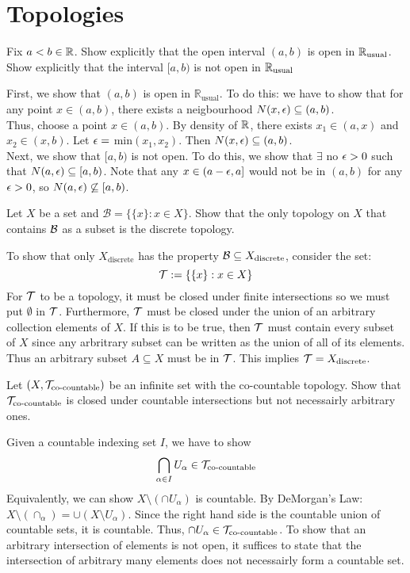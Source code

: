 \chapter{Topologies}

\begin{ExerciseList}
	\Exercise[difficulty=1] Fix $a<b\in\mathbb{R}$. Show explicitly that the %
    open interval $(a,b)$ is open in $\mathbb{R}_{\text{usual}}$. Show %
    explicitly that the interval $[a,b)$ is not open in %
    $\mathbb{R}_{\text{usual}}$

	\Answer First, we show that $(a, b)$ is open in %
    $\mathbb{R}_{\text{usual}}$. To do this: we have to show that %
    for any point $x\in (a,b)$, there exists a neigbourhood $N(x,\e) %
    \subseteq (a,b)$.\\
    Thus, choose a point $x\in(a,b)$. By density of $\mathbb{R}$, there %
    exists $x_1\in(a,x)$ and $x_2\in(x,b)$. Let $\epsilon =$ min$(x_1,x_2).%
    $ Then $N(x,\epsilon) \subseteq (a,b)$.\\
    Next, we show that $[a,b)$ is not open. To do this, we show that %
    $\exists$ no $\epsilon>0$ such that $N(a,\epsilon) \subseteq [a,b)$. Note %
    that any $x\in (a-\epsilon,a]$ would not be in $(a,b)$ for any $\epsilon>0$, %
    so $N(a,\epsilon)\not\subseteq [a,b)$.

    \Exercise[difficulty=1] Let $X$ be a set and $\mathcal{B} = %
    \{ \{x\}: x\in X\}$. Show that the only topology on $X$ that %
    contains $\mathcal{B}$ as a subset is the discrete topology.

    \Answer To show that only $X_{\text{discrete}}$ has the property %
    $\mathcal{B}\subseteq X_{\text{discrete}}$, consider the set:
    \[\mathcal{T} := \{ \{x\}: x\in X\}\]
    For $\mathcal{T}$ to be a topology, it must be closed under finite %
    intersections so we must put $\emptyset$ in $\mathcal{T}$. Furthermore, %
    $\mathcal{T}$ must be closed under the union of an arbitrary collection %
    elements of $X$. If this is to be true, then $\mathcal{T}$ must contain %
    every subset of $X$ since any arbritrary subset can be written %
    as the union of all of its elements. Thus an arbitrary subset %
    $A\subseteq X$ must be in $\mathcal{T}$. This implies %
    $\mathcal{T} = X_{\text{discrete}}$.


    \Exercise[difficulty=1] Let $(X, \mathcal{T}_{\text{co-countable}})$ be %
    an infinite set with the co-countable topology. Show that %
    $\mathcal{T}_{\text{co-countable}}$ is closed under countable %
    intersections but not necessairly arbitrary ones.

    \Answer Given a countable indexing set $I$, we have to show %
    \[\bigcap_{\alpha\in I} U_{\alpha} \in \mathcal{T}_{\text{co-countable}}\]
    Equivalently, we can show $X \setminus (\cap U_{\alpha})$ %
    is countable. By DeMorgan's Law: $X\setminus(\cap_{\alpha})=
    \cup (X\setminus U_{\alpha})$. Since the right hand side %
    is the countable union of countable sets, it is countable.
    Thus, $\cap U_{\alpha} \in \mathcal{T}_{\text{co-countable}}$. To show %
    that an arbitrary intersection of elements is not open, it %
    suffices to state that the intersection of arbitrary many %
    elements does not necessairly form a countable set.


\end{ExerciseList}
